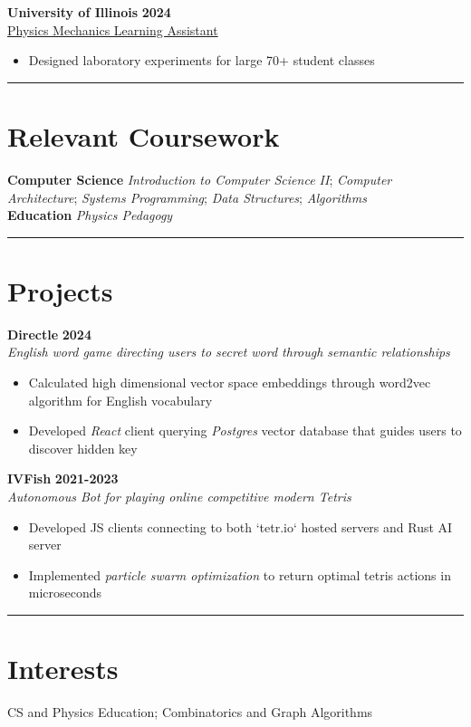 \documentclass[11pt]{article}
\begin{document}
\textbf{University of Illinois} \hfill \textbf{2024} \\
\underline{Physics Mechanics Learning Assistant}
\begin{itemize}
	\cramped
	\item Designed laboratory experiments for large 70+ student classes
\end{itemize}

\rule{\textwidth}{0.1pt}
\vspace*{-10mm}

\section*{Relevant Coursework}
\textbf{Computer Science}
\emph{Introduction to Computer Science II};
\emph{Computer Architecture};
\emph{Systems Programming};
\emph{Data Structures};
\emph{Algorithms} \\

\textbf{Education}
\emph{Physics Pedagogy}

\rule{\textwidth}{0.1pt}
\vspace*{-10mm}


\section*{Projects}

\textbf{Directle} \hfill \textbf{2024} \\
\emph{English word game directing users to secret word through semantic relationships}
\begin{itemize}
	\cramped
    \item Calculated high dimensional vector space embeddings through word2vec algorithm for English vocabulary
    \item Developed \emph{React} client querying \emph{Postgres} vector database that guides users to discover hidden key
\end{itemize}

\textbf{IVFish} \hfill \textbf{2021-2023} \\
\emph{Autonomous Bot for playing online competitive modern Tetris}
\begin{itemize}
	\cramped
	\item Developed JS clients connecting to both `tetr.io` hosted servers and Rust AI server
    \item Implemented \emph{particle swarm optimization} to return optimal tetris actions in microseconds
\end{itemize}

\rule{\textwidth}{0.1pt}
\vspace*{-10mm}

\section*{Interests}
CS and Physics Education;
Combinatorics and Graph Algorithms
\end{document}
